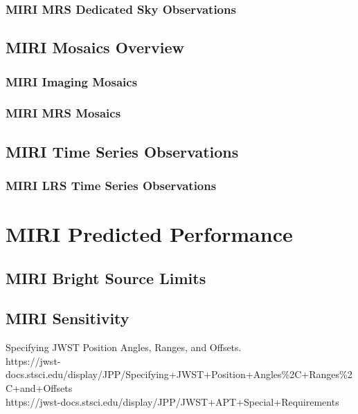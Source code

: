 \subsubsection{MIRI MRS Dedicated Sky Observations}

\subsection{MIRI Mosaics Overview}
\subsubsection{MIRI Imaging Mosaics}
\subsubsection{MIRI MRS Mosaics}

\subsection{MIRI Time Series Observations}
\subsubsection{MIRI LRS Time Series Observations}

\section{MIRI Predicted Performance}
\subsection{MIRI Bright Source Limits}
\subsection{MIRI Sensitivity}

\smallskip \smallskip
\noindent
Specifying JWST Position Angles, Ranges, and Offsets.\\
https://jwst-docs.stsci.edu/display/JPP/Specifying+JWST+Position+Angles\%2C+Ranges\%2C+and+Offsets\\
https://jwst-docs.stsci.edu/display/JPP/JWST+APT+Special+Requirements\\


